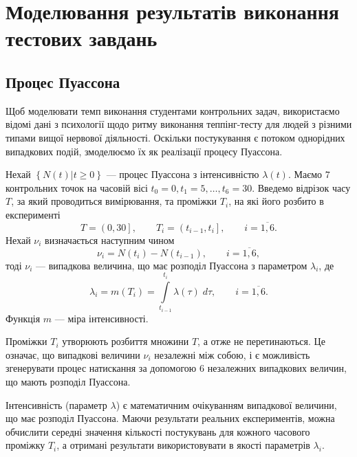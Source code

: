 \section{Моделювання результатів виконання тестових завдань}

\subsection{Процес Пуассона}
Щоб моделювати темп виконання студентами контрольних задач, використаємо
відомі дані з психології щодо ритму виконання теппінг-тесту для людей
з різними типами вищої нервової діяльності.
Оскільки постукування є потоком однорідних випадкових подій, змоделюємо їх
як реалізації процесу Пуассона.

Нехай $\left\{ N\left( t \right) \vert t \ge 0 \right\}$ --- процес Пуассона з
інтенсивністю $\lambda\left( t \right)$.
Маємо $7$ контрольних точок на часовій вісі $t_0 = 0, t_1 = 5, \dots, t_6 = 30$.
Введемо відрізок часу $T$, за який проводиться вимірювання,
та проміжки $T_i$, на які його розбито в експерименті
\begin{equation*}
  T = \left( 0, 30 \right], \qquad
  T_i = \left( t_{i-1}, t_i \right], \qquad
  i = \overline{1, 6}.
\end{equation*}
Нехай $\nu_i$ визначається наступним чином
\begin{equation*}
  \nu_i = N\left( t_i \right) - N\left( t_{i-1} \right),
  \qquad i = \overline{1,6},
\end{equation*}
тоді $\nu_i$ --- випадкова величина, що має розподіл Пуассона з параметром
$\lambda_i$, де \cite{Bulinsky:2003}
\begin{equation*}
  \lambda_i
  = m\left( T_i \right)
  = \int\limits_{t_{i-1}}^{t_i} \lambda\left( \tau \right) \; d\tau, \qquad
  i = \overline{1, 6}.
\end{equation*}
Функція $m$ --- міра інтенсивності. \cite{Kingman:1992}

Проміжки $T_i$ утворюють розбиття множини $T$, а отже не перетинаються.
Це означає, що випадкові величини $\nu_i$ незалежні між собою,
і є можливість згенерувати процес натискання за допомогою $6$ незалежних
випадкових величин, що мають розподіл Пуассона.

Інтенсивність (параметр $\lambda$) є математичним очікуванням випадкової
величини, що має розподіл Пуассона.
Маючи результати реальних експериментів, можна обчислити середні значення
кількості постукувань для кожного часового проміжку $T_i$, а отримані
результати використовувати в якості параметрів $\lambda_i$.

